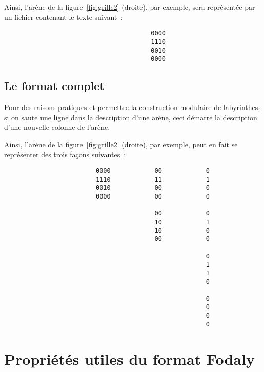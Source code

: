 \documentclass[a4paper]{paper}
\newcommand{\nomFormat}{Fodaly}
\begin{document}
Ainsi, l'arène de la figure~\ref{fig:grille2} (droite), par exemple, sera représentée par un fichier contenant le texte suivant~:
\begin{verbatim}
                                        0000
                                        1110
                                        0010
                                        0000
\end{verbatim}

\subsection{Le format complet}

Pour des raisons pratiques et permettre la construction modulaire de labyrinthes, si on saute une ligne dans la description d'une arène, ceci démarre la description d'une nouvelle colonne de l'arène.

Ainsi, l'arène de la figure~\ref{fig:grille2} (droite), par exemple, peut en fait se représenter des trois façons suivantes~:

\begin{verbatim}
                         0000            00            0
                         1110            11            1
                         0010            00            0
                         0000            00            0

                                         00            0
                                         10            1
                                         10            0
                                         00            0

                                                       0
                                                       1
                                                       1
                                                       0

                                                       0
                                                       0
                                                       0
                                                       0
\end{verbatim}


\section{Propriétés utiles du format \nomFormat{}}

\end{document}
